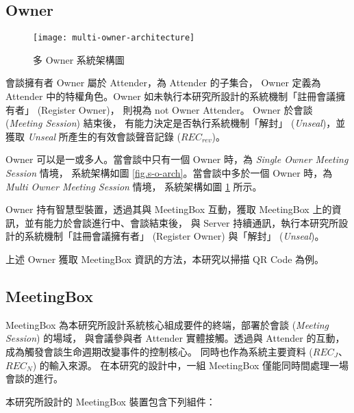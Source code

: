 \subsection{Owner}

\begin{figure}[H]
    \centering
    \texttt{[image: multi-owner-architecture]}
    \caption{多 Owner 系統架構圖}
    \label{fig.m-o-arch}
\end{figure}

    會談擁有者 Owner 屬於 Attender，為 Attender 的子集合，
Owner 定義為 Attender 中的特權角色。Owner 如未執行本研究所設計的系統機制「註冊會議擁有者」 (Register Owner)，
則視為 not Owner Attender。 Owner 於會談 ({\it Meeting Session}) 結束後，
有能力決定是否執行系統機制「解封」 ({\it Unseal})，並獲取 {\it Unseal} 所產生的有效會談聲音記錄 ($REC_{rev}$)。

    Owner 可以是一或多人。當會談中只有一個 Owner 時，為 {\it Single Owner Meeting Session} 情境，
系統架構如圖 \ref{fig.s-o-arch}。當會談中多於一個 Owner 時，為 {\it Multi Owner Meeting Session} 情境，
系統架構如圖 \ref{fig.m-o-arch} 所示。

    Owner 持有智慧型裝置，透過其與 MeetingBox 互動，獲取 MeetingBox 上的資訊，並有能力於會談進行中、會談結束後，
與 Server 持續通訊，執行本研究所設計的系統機制「註冊會議擁有者」 (Register Owner) 與「解封」 ({\it Unseal})。

    上述 Owner 獲取 MeetingBox 資訊的方法，本研究以掃描 QR Code 為例。


\subsection{MeetingBox}

    MeetingBox 為本研究所設計系統核心組成要件的終端，部署於會談 ({\it Meeting Session}) 的場域，
與會議參與者 Attender 實體接觸。透過與 Attender 的互動，成為觸發會談生命週期改變事件的控制核心。
同時也作為系統主要資料 ($REC_{J}$、$REC_{N}$) 的輸入來源。
在本研究的設計中，一組 MeetingBox 僅能同時間處理一場會談的進行。

    本研究所設計的 MeetingBox 裝置包含下列組件：

